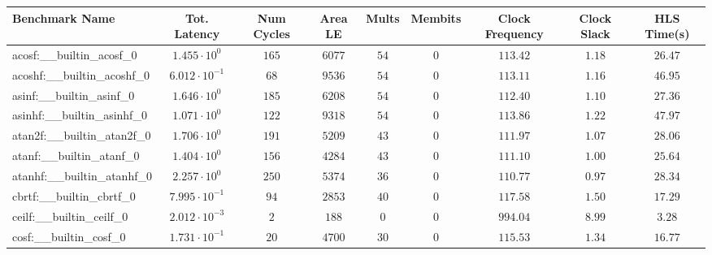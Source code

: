 \begin{tabular}{|l|c|c|c|c|c|c|c|c|}
\hline
Benchmark Name                            & Tot. Latency            & Num Cycles & Area LE    & Mults    & Membits & Clock Frequency & Clock Slack & HLS Time(s) \\
\hline
acosf:\_\_builtin\_acosf\_0               & $ 1.455 \cdot 10^{0}  $ & $ 165    $ & $ 6077   $ & $ 54   $ & $ 0   $ & $ 113.42      $ & $ 1.18    $ & $ 26.47   $ \\
acoshf:\_\_builtin\_acoshf\_0             & $ 6.012 \cdot 10^{-1} $ & $ 68     $ & $ 9536   $ & $ 54   $ & $ 0   $ & $ 113.11      $ & $ 1.16    $ & $ 46.95   $ \\
asinf:\_\_builtin\_asinf\_0               & $ 1.646 \cdot 10^{0}  $ & $ 185    $ & $ 6208   $ & $ 54   $ & $ 0   $ & $ 112.40      $ & $ 1.10    $ & $ 27.36   $ \\
asinhf:\_\_builtin\_asinhf\_0             & $ 1.071 \cdot 10^{0}  $ & $ 122    $ & $ 9318   $ & $ 54   $ & $ 0   $ & $ 113.86      $ & $ 1.22    $ & $ 47.97   $ \\
atan2f:\_\_builtin\_atan2f\_0             & $ 1.706 \cdot 10^{0}  $ & $ 191    $ & $ 5209   $ & $ 43   $ & $ 0   $ & $ 111.97      $ & $ 1.07    $ & $ 28.06   $ \\
atanf:\_\_builtin\_atanf\_0               & $ 1.404 \cdot 10^{0}  $ & $ 156    $ & $ 4284   $ & $ 43   $ & $ 0   $ & $ 111.10      $ & $ 1.00    $ & $ 25.64   $ \\
atanhf:\_\_builtin\_atanhf\_0             & $ 2.257 \cdot 10^{0}  $ & $ 250    $ & $ 5374   $ & $ 36   $ & $ 0   $ & $ 110.77      $ & $ 0.97    $ & $ 28.34   $ \\
cbrtf:\_\_builtin\_cbrtf\_0               & $ 7.995 \cdot 10^{-1} $ & $ 94     $ & $ 2853   $ & $ 40   $ & $ 0   $ & $ 117.58      $ & $ 1.50    $ & $ 17.29   $ \\
ceilf:\_\_builtin\_ceilf\_0               & $ 2.012 \cdot 10^{-3} $ & $ 2      $ & $ 188    $ & $ 0    $ & $ 0   $ & $ 994.04      $ & $ 8.99    $ & $ 3.28    $ \\
cosf:\_\_builtin\_cosf\_0                 & $ 1.731 \cdot 10^{-1} $ & $ 20     $ & $ 4700   $ & $ 30   $ & $ 0   $ & $ 115.53      $ & $ 1.34    $ & $ 16.77   $ \\

\end{tabular}
